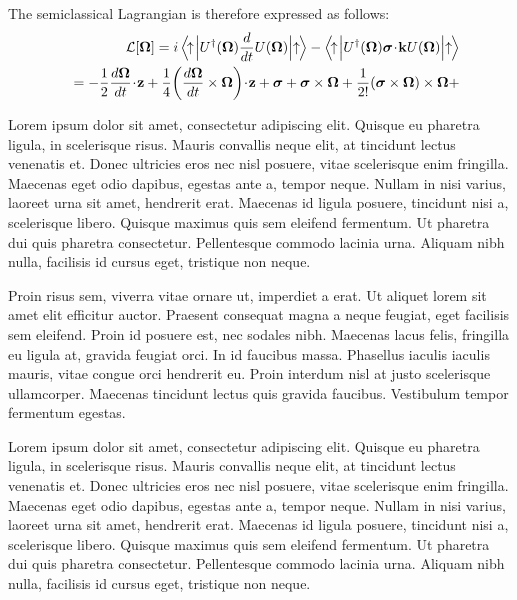 \documentclass[english,aps,prd,nofootinbib,twocolumn]{revtex4-1}
\begin{document}
The semiclassical Lagrangian is therefore expressed as follows:
\begin{eqnarray}
&&\mathcal{L}[\boldsymbol{\Omega}] = i
\left\langle
\!
\uparrow^{\textcolor{white}{\dagger}}_{\textcolor{white}{\dagger}}\!
\!
\right|
\!
U^{\dagger}(\boldsymbol{\Omega})
\frac{d}{dt}
U(\boldsymbol{\Omega})
\!
\left|
\uparrow^{\textcolor{white}{\dagger}}_{\textcolor{white}{\dagger}}\!\!\!
\right\rangle 
-
\left\langle
\!
\uparrow^{\textcolor{white}{\dagger}}_{\textcolor{white}{\dagger}}\!
\!
\right|
\!
U^{\dagger}(\boldsymbol{\Omega})
\boldsymbol{\sigma}\! \cdot \! \mathbf{k}
U(\boldsymbol{\Omega})
\!
\left|
\uparrow^{\textcolor{white}{\dagger}}_{\textcolor{white}{\dagger}}\!
\!\!
\right\rangle
\nonumber 
\\ &&= 
-
\frac{1}{2} 
\frac{d\boldsymbol{\Omega}}{dt}
\!
\cdot
\!
\mathbf{z}
+
\frac{1}{4}\!
\left(
\frac{d\boldsymbol{\Omega}}{dt}
\times 
\boldsymbol{\Omega}
\right)
\!\cdot\!
\mathbf{z} 
+
\boldsymbol{\sigma} + 
\boldsymbol{\sigma} \times \boldsymbol{\Omega} +
\frac{1}{2!}
(\boldsymbol{\sigma} \times \boldsymbol{\Omega})
\times \boldsymbol{\Omega} +  
\end{eqnarray}

Lorem ipsum dolor sit amet, consectetur adipiscing elit. Quisque eu pharetra ligula, in scelerisque risus. Mauris convallis neque elit, at tincidunt lectus venenatis et. Donec ultricies eros nec nisl posuere, vitae scelerisque enim fringilla. Maecenas eget odio dapibus, egestas ante a, tempor neque. Nullam in nisi varius, laoreet urna sit amet, hendrerit erat. Maecenas id ligula posuere, tincidunt nisi a, scelerisque libero. Quisque maximus quis sem eleifend fermentum. Ut pharetra dui quis pharetra consectetur. Pellentesque commodo lacinia urna. Aliquam nibh nulla, facilisis id cursus eget, tristique non neque.

Proin risus sem, viverra vitae ornare ut, imperdiet a erat. Ut aliquet lorem sit amet elit efficitur auctor. Praesent consequat magna a neque feugiat, eget facilisis sem eleifend. Proin id posuere est, nec sodales nibh. Maecenas lacus felis, fringilla eu ligula at, gravida feugiat orci. In id faucibus massa. Phasellus iaculis iaculis mauris, vitae congue orci hendrerit eu. Proin interdum nisl at justo scelerisque ullamcorper. Maecenas tincidunt lectus quis gravida faucibus. Vestibulum tempor fermentum egestas.

Lorem ipsum dolor sit amet, consectetur adipiscing elit. Quisque eu pharetra ligula, in scelerisque risus. Mauris convallis neque elit, at tincidunt lectus venenatis et. Donec ultricies eros nec nisl posuere, vitae scelerisque enim fringilla. Maecenas eget odio dapibus, egestas ante a, tempor neque. Nullam in nisi varius, laoreet urna sit amet, hendrerit erat. Maecenas id ligula posuere, tincidunt nisi a, scelerisque libero. Quisque maximus quis sem eleifend fermentum. Ut pharetra dui quis pharetra consectetur. Pellentesque commodo lacinia urna. Aliquam nibh nulla, facilisis id cursus eget, tristique non neque.
\end{document}
